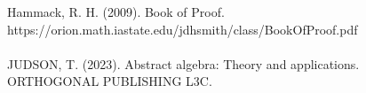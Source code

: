 \documentclass[sigconf]{article}
\begin{document}

Hammack, R. H. (2009). Book of Proof.\\ https://orion.math.iastate.edu/jdhsmith/class/BookOfProof.pdf
\\
\\
JUDSON, T. (2023). Abstract algebra: Theory and applications. ORTHOGONAL PUBLISHING L3C. 


\end{document}
